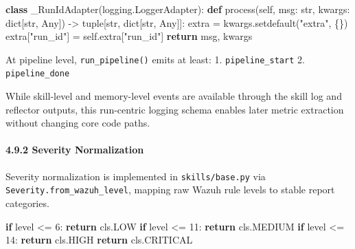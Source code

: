 \documentclass[
]{article}
\newenvironment{Shaded}{}{}
\newcommand{\BuiltInTok}[1]{\textcolor[rgb]{0.00,0.50,0.00}{#1}}
\newcommand{\ControlFlowTok}[1]{\textcolor[rgb]{0.00,0.44,0.13}{\textbf{#1}}}
\newcommand{\DecValTok}[1]{\textcolor[rgb]{0.25,0.63,0.44}{#1}}
\newcommand{\KeywordTok}[1]{\textcolor[rgb]{0.00,0.44,0.13}{\textbf{#1}}}
\newcommand{\NormalTok}[1]{#1}
\newcommand{\OperatorTok}[1]{\textcolor[rgb]{0.40,0.40,0.40}{#1}}
\newcommand{\StringTok}[1]{\textcolor[rgb]{0.25,0.44,0.63}{#1}}
\newcommand{\VariableTok}[1]{\textcolor[rgb]{0.10,0.09,0.49}{#1}}
\begin{document}
\begin{Shaded}
\begin{Highlighting}[]
\KeywordTok{class}\NormalTok{ \_RunIdAdapter(logging.LoggerAdapter):}
    \KeywordTok{def}\NormalTok{ process(}\VariableTok{self}\NormalTok{, msg: }\BuiltInTok{str}\NormalTok{, kwargs: }\BuiltInTok{dict}\NormalTok{[}\BuiltInTok{str}\NormalTok{, Any]) }\OperatorTok{{-}\textgreater{}} \BuiltInTok{tuple}\NormalTok{[}\BuiltInTok{str}\NormalTok{, }\BuiltInTok{dict}\NormalTok{[}\BuiltInTok{str}\NormalTok{, Any]]:}
\NormalTok{        extra }\OperatorTok{=}\NormalTok{ kwargs.setdefault(}\StringTok{"extra"}\NormalTok{, \{\})}
\NormalTok{        extra[}\StringTok{"run\_id"}\NormalTok{] }\OperatorTok{=} \VariableTok{self}\NormalTok{.extra[}\StringTok{"run\_id"}\NormalTok{]}
        \ControlFlowTok{return}\NormalTok{ msg, kwargs}
\end{Highlighting}
\end{Shaded}

At pipeline level, \texttt{run\_pipeline()} emits at least: 1.
\texttt{pipeline\_start} 2. \texttt{pipeline\_done}

While skill-level and memory-level events are available through the
skill log and reflector outputs, this run-centric logging schema enables
later metric extraction without changing core code paths.

\paragraph{4.9.2 Severity Normalization}\label{severity-normalization}

Severity normalization is implemented in \texttt{skills/base.py} via
\texttt{Severity.from\_wazuh\_level}, mapping raw Wazuh rule levels to
stable report categories.

\begin{Shaded}
\begin{Highlighting}[]
\ControlFlowTok{if}\NormalTok{ level }\OperatorTok{\textless{}=} \DecValTok{6}\NormalTok{:}
    \ControlFlowTok{return}\NormalTok{ cls.LOW}
\ControlFlowTok{if}\NormalTok{ level }\OperatorTok{\textless{}=} \DecValTok{11}\NormalTok{:}
    \ControlFlowTok{return}\NormalTok{ cls.MEDIUM}
\ControlFlowTok{if}\NormalTok{ level }\OperatorTok{\textless{}=} \DecValTok{14}\NormalTok{:}
    \ControlFlowTok{return}\NormalTok{ cls.HIGH}
\ControlFlowTok{return}\NormalTok{ cls.CRITICAL}
\end{Highlighting}
\end{Shaded}
\end{document}
